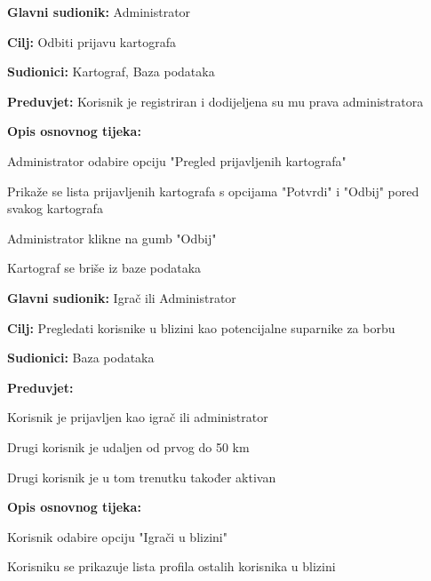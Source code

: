\noindent {}
\begin{packed_item}
	
	\item \textbf{Glavni sudionik: } Administrator
	\item  \textbf{Cilj:} Odbiti prijavu kartografa
	\item  \textbf{Sudionici:} Kartograf, Baza podataka
	\item  \textbf{Preduvjet:} Korisnik je registriran i dodijeljena su mu prava administratora
	\item  \textbf{Opis osnovnog tijeka:}
	
	\item[] \begin{packed_enum}
		
		\item Administrator odabire opciju "Pregled prijavljenih kartografa"
		\item Prikaže se lista prijavljenih kartografa s opcijama "Potvrdi" i "Odbij" pored svakog kartografa
		\item Administrator klikne na gumb "Odbij"
		\item Kartograf se briše iz baze podataka
	\end{packed_enum}
\end{packed_item}

\noindent {}
\begin{packed_item}
	
	\item \textbf{Glavni sudionik: } Igrač ili Administrator
	\item \textbf{Cilj:} Pregledati korisnike u blizini kao potencijalne suparnike za borbu
	\item \textbf{Sudionici:} Baza podataka
	\item \textbf{Preduvjet:} 
    \item[] \begin{packed_enum}
        \item Korisnik je prijavljen kao igrač ili administrator
        \item Drugi korisnik je udaljen od prvog do 50 km
        \item Drugi korisnik je u tom trenutku također aktivan    
    \end{packed_enum}
	\item  \textbf{Opis osnovnog tijeka:}
	\item[] \begin{packed_enum}
        \item Korisnik odabire opciju "Igrači u blizini"
        \item Korisniku se prikazuje lista profila ostalih korisnika u blizini
	\end{packed_enum}
\end{packed_item}

